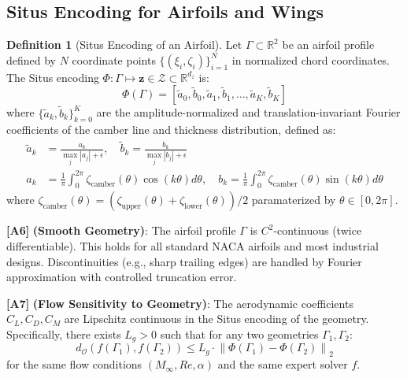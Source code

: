 \documentclass[11pt,a4paper]{article}
\theoremstyle{definition}
\newtheorem{definition}[theorem]{Definition}
\theoremstyle{remark}
\newcommand{\assumptionTag}[1]{\textsf{\textbf{[A#1]}}}
\newcommand{\R}{\mathbb{R}}
\newcommand{\norm}[1]{\left\lVert#1\right\rVert}
\begin{document}
\subsection{Situs Encoding for Airfoils and Wings}

\begin{definition}[Situs Encoding of an Airfoil]
\label{def:situs_airfoil}
Let $\Gamma \subset \R^2$ be an airfoil profile defined by $N$ coordinate points $\{(\xi_i, \zeta_i)\}_{i=1}^N$ in normalized chord coordinates.
The Situs encoding $\Phi: \Gamma \mapsto \mathbf{z} \in \mathcal{Z} \subset \R^{d_z}$ is:
\begin{equation}
\Phi(\Gamma) = \left[ \tilde{a}_0, \tilde{b}_0, \tilde{a}_1, \tilde{b}_1, \dots, \tilde{a}_K, \tilde{b}_K \right]
\label{eq:situs_encode}
\end{equation}
where $\{\tilde{a}_k, \tilde{b}_k\}_{k=0}^K$ are the amplitude-normalized and translation-invariant Fourier coefficients of the camber line and thickness distribution, defined as:
\begin{align}
\tilde{a}_k &= \frac{a_k}{\max_{j} |a_j| + \epsilon}, \quad \tilde{b}_k = \frac{b_k}{\max_{j} |b_j| + \epsilon} \\
a_k &= \frac{1}{\pi} \int_{0}^{2\pi} \zeta_{\text{camber}}(\theta) \cos(k\theta) d\theta, \quad b_k = \frac{1}{\pi} \int_{0}^{2\pi} \zeta_{\text{camber}}(\theta) \sin(k\theta) d\theta
\label{eq:fourier_coeffs}
\end{align}
where $\zeta_{\text{camber}}(\theta) = (\zeta_{\text{upper}}(\theta) + \zeta_{\text{lower}}(\theta))/2$ paramaterized by $\theta \in [0, 2\pi]$.
\end{definition}

\assumptionTag{6} \textbf{(Smooth Geometry)}: The airfoil profile $\Gamma$ is $C^2$-continuous (twice differentiable). This holds for all standard NACA airfoils and most industrial designs. Discontinuities (e.g., sharp trailing edges) are handled by Fourier approximation with controlled truncation error.

\assumptionTag{7} \textbf{(Flow Sensitivity to Geometry)}: The aerodynamic coefficients $C_L, C_D, C_M$ are Lipschitz continuous in the Situs encoding of the geometry. Specifically, there exists $L_g > 0$ such that for any two geometries $\Gamma_1, \Gamma_2$:
\begin{equation}
d_{\mathcal{O}}(f(\Gamma_1), f(\Gamma_2)) \leq L_g \cdot \norm{\Phi(\Gamma_1) - \Phi(\Gamma_2)}_2
\label{eq:lipschitz_geom}
\end{equation}
for the same flow conditions $(M_\infty, Re, \alpha)$ and the same expert solver $f$.
\end{document}
